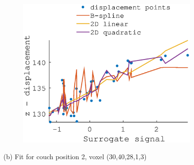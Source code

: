 \documentclass[11pt,a4paper,oneside]{report}
\begin{document}
\begin{figure}[H]
\begin{subfigure}[b]{0.33\textwidth}
  \end{subfigure}
    ~ %
  \begin{subfigure}[b]{0.33\textwidth}
    \includegraphics[width=\textwidth, trim=0 0 0 110,clip=true]{figures/task2/fit_round3_couch2.eps}
  \end{subfigure}
  (b) Fit for couch position 2, voxel (30,40,28,1,3)
  \vspace*{1em}
  

\end{figure}
\end{document}
